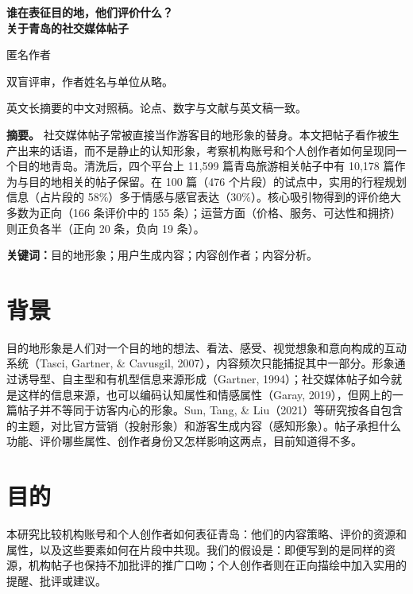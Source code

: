 \documentclass[11pt]{article}
\begin{document}
\begin{center}
{\Large\bfseries 谁在表征目的地，他们评价什么？\\[0.4em]
关于青岛的社交媒体帖子\par}
\vspace{1.1em}
{\large 匿名作者\par}
\vspace{0.7em}
{\normalsize 双盲评审，作者姓名与单位从略。\par}
\vspace{0.8em}
{\small 英文长摘要的中文对照稿。论点、数字与文献与英文稿一致。\par}
\end{center}

\vspace{0.6em}
\noindent\textbf{摘要。}
社交媒体帖子常被直接当作游客目的地形象的替身。本文把帖子看作被生产出来的话语，而不是静止的认知形象，考察机构账号和个人创作者如何呈现同一个目的地青岛。清洗后，四个平台上 11,599 篇青岛旅游相关帖子中有 10,178 篇作为与目的地相关的帖子保留。在 100 篇（476 个片段）的试点中，实用的行程规划信息（占片段的 58\%）多于情感与感官表达（30\%）。核心吸引物得到的评价绝大多数为正向（166 条评价中的 155 条）；运营方面（价格、服务、可达性和拥挤）则正负各半（正向 20 条，负向 19 条）。

\vspace{0.8em}
\noindent\textbf{关键词：}目的地形象；用户生成内容；内容创作者；内容分析。

\section{背景}
目的地形象是人们对一个目的地的想法、看法、感受、视觉想象和意向构成的互动系统（Tasci, Gartner, \& Cavusgil, 2007），内容频次只能捕捉其中一部分。形象通过诱导型、自主型和有机型信息来源形成（Gartner, 1994）；社交媒体帖子如今就是这样的信息来源，也可以编码认知属性和情感属性（Garay, 2019），但网上的一篇帖子并不等同于访客内心的形象。Sun, Tang, \& Liu（2021）等研究按各自包含的主题，对比官方营销（投射形象）和游客生成内容（感知形象）。帖子承担什么功能、评价哪些属性、创作者身份又怎样影响这两点，目前知道得不多。

\section{目的}
本研究比较机构账号和个人创作者如何表征青岛：他们的内容策略、评价的资源和属性，以及这些要素如何在片段中共现。我们的假设是：即便写到的是同样的资源，机构帖子也保持不加批评的推广口吻；个人创作者则在正向描绘中加入实用的提醒、批评或建议。
\end{document}
